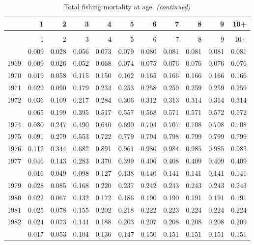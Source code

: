 \documentclass[
]{article}
\begin{document}
\begin{longtable}[t]{lrrrrrrrrrr}
\caption{\label{tab:FAA-tot-table}Total fishing mortality at age.}\\
\toprule
  & 1 & 2 & 3 & 4 & 5 & 6 & 7 & 8 & 9 & 10+\\
\midrule
\endfirsthead
\caption[]{Total fishing mortality at age. \textit{(continued)}}\\
\toprule
  & 1 & 2 & 3 & 4 & 5 & 6 & 7 & 8 & 9 & 10+\\
\midrule
\endhead

\endfoot
\bottomrule
\endlastfoot
1968 & 0.009 & 0.028 & 0.056 & 0.073 & 0.079 & 0.080 & 0.081 & 0.081 & 0.081 & 0.081\\
1969 & 0.009 & 0.026 & 0.052 & 0.068 & 0.074 & 0.075 & 0.076 & 0.076 & 0.076 & 0.076\\
1970 & 0.019 & 0.058 & 0.115 & 0.150 & 0.162 & 0.165 & 0.166 & 0.166 & 0.166 & 0.166\\
1971 & 0.029 & 0.090 & 0.179 & 0.234 & 0.253 & 0.258 & 0.259 & 0.259 & 0.259 & 0.259\\
1972 & 0.036 & 0.109 & 0.217 & 0.284 & 0.306 & 0.312 & 0.313 & 0.314 & 0.314 & 0.314\\
\addlinespace
1973 & 0.065 & 0.199 & 0.395 & 0.517 & 0.557 & 0.568 & 0.571 & 0.571 & 0.572 & 0.572\\
1974 & 0.080 & 0.247 & 0.490 & 0.640 & 0.690 & 0.704 & 0.707 & 0.708 & 0.708 & 0.708\\
1975 & 0.091 & 0.279 & 0.553 & 0.722 & 0.779 & 0.794 & 0.798 & 0.799 & 0.799 & 0.799\\
1976 & 0.112 & 0.344 & 0.682 & 0.891 & 0.961 & 0.980 & 0.984 & 0.985 & 0.985 & 0.985\\
1977 & 0.046 & 0.143 & 0.283 & 0.370 & 0.399 & 0.406 & 0.408 & 0.409 & 0.409 & 0.409\\
\addlinespace
1978 & 0.016 & 0.049 & 0.098 & 0.127 & 0.138 & 0.140 & 0.141 & 0.141 & 0.141 & 0.141\\
1979 & 0.028 & 0.085 & 0.168 & 0.220 & 0.237 & 0.242 & 0.243 & 0.243 & 0.243 & 0.243\\
1980 & 0.022 & 0.067 & 0.132 & 0.172 & 0.186 & 0.190 & 0.190 & 0.191 & 0.191 & 0.191\\
1981 & 0.025 & 0.078 & 0.155 & 0.202 & 0.218 & 0.222 & 0.223 & 0.224 & 0.224 & 0.224\\
1982 & 0.024 & 0.073 & 0.144 & 0.188 & 0.203 & 0.207 & 0.208 & 0.208 & 0.208 & 0.209\\
\addlinespace
1983 & 0.017 & 0.053 & 0.104 & 0.136 & 0.147 & 0.150 & 0.151 & 0.151 & 0.151 & 0.151\\

\end{longtable}
\end{document}
